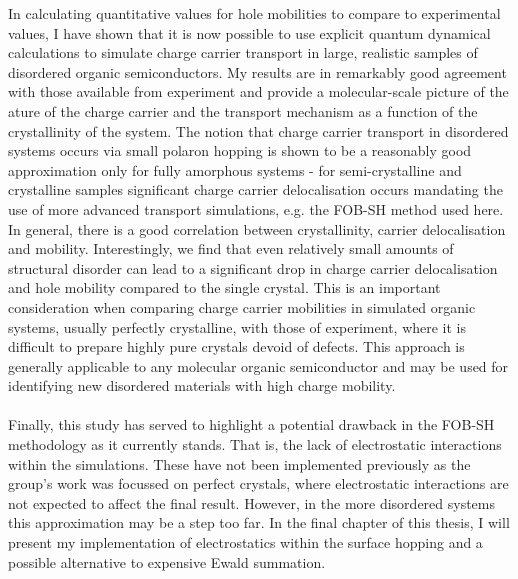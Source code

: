 In calculating quantitative values for hole mobilities to compare to experimental values, I have shown that it is now possible to use explicit quantum dynamical calculations to simulate charge carrier transport in large, realistic samples of disordered organic semiconductors. My results are in remarkably good agreement with those available from experiment and provide a molecular-scale picture of the ature of the charge carrier and the transport mechanism as a function of the crystallinity of the system. The notion that charge carrier transport in disordered systems occurs via small polaron hopping is shown to be a reasonably good approximation only for fully amorphous systems - for semi-crystalline and crystalline samples significant charge carrier delocalisation occurs mandating the use of more advanced transport simulations, e.g.  the FOB-SH method used here. In general, there is a good correlation between crystallinity, carrier delocalisation and mobility.  Interestingly, we find that even relatively small amounts of structural disorder can lead to a significant drop in charge carrier delocalisation and hole mobility compared to the single crystal. This is an important consideration when comparing charge carrier mobilities in simulated organic systems, usually perfectly crystalline, with those of experiment, where it is difficult to prepare highly pure crystals devoid of defects. This approach is generally applicable to any molecular organic semiconductor and may be used for identifying new disordered materials with high charge mobility. 
\\\\
Finally, this study has served to highlight a potential drawback in the FOB-SH methodology as it currently stands. That is, the lack of electrostatic interactions within the simulations. These have not been implemented previously as the group's work was focussed on perfect crystals, where electrostatic interactions are not expected to affect the final result. However, in the more disordered systems this approximation may be a step too far. In the final chapter of this thesis, I will present my implementation of electrostatics within the surface hopping and a possible alternative to expensive Ewald summation.



